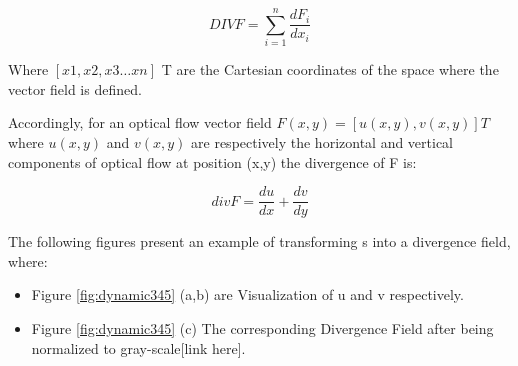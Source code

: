\documentclass[12pt,fleqn]{book} %
\begin{document}
\begin{dBox}
\begin{equation}
DIVF = \sum_{i=1}^{n}\frac{d F_i}{d x_i}
\end{equation}
\end{dBox}

Where $[x1, x2, x3 … xn]$ T are the Cartesian coordinates of the space where the vector field is defined.\bigskip

Accordingly, for an optical flow vector field $F(x,y) = [u(x,y), v(x,y)]T$ where $u(x,y)$ and $v(x,y)$ are respectively the horizontal and vertical components of optical flow at position (x,y) the divergence of F is:

\begin{dBox}
\begin{equation}
divF = \frac{du}{dx} + \frac{dv}{dy}
\end{equation}
\end{dBox}
\bigskip

The following figures present an example of transforming s into a divergence field, where:

\begin{itemize}
\item Figure \ref{fig:dynamic345} (a,b) are Visualization of u and v respectively. 

\item Figure \ref{fig:dynamic345} (c) The corresponding Divergence Field after being normalized to gray-scale[link here].
\end{itemize}
\end{document}
